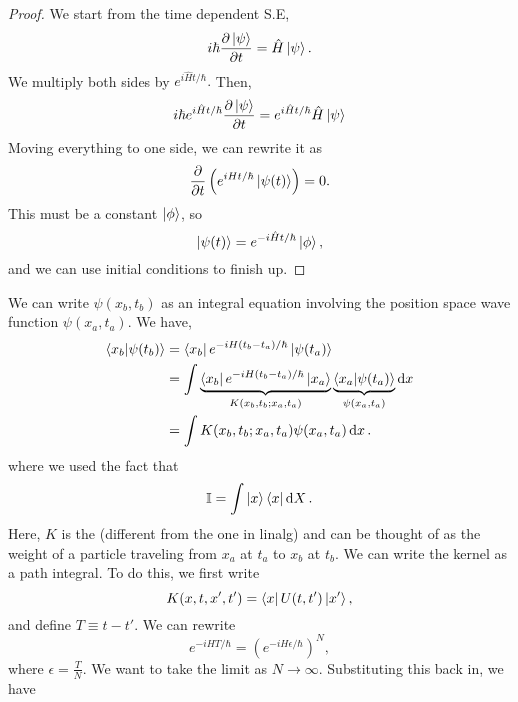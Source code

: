\documentclass{article}
\numberwithin{equation}{section}
\begin{document}
\begin{proof}
    We start from the time dependent S.E,
    \begin{equation}
        i\hbar \frac{\partial \ket{\psi}}{\partial t} = \hat{H}\ket{\psi}.
    \end{equation}
    We multiply both sides by $e^{i\hat{H}t/\hbar}.$ Then,
    \begin{align}
        i\hbar e^{i\hat{H}t/\hbar}\frac{\partial \ket{\psi}}{\partial t} = e^{i\hat{H}t/\hbar} \hat{H}\ket{\psi}
    \end{align}
    Moving everything to one side, we can rewrite it as 
    \begin{equation}
        \frac{\partial}{\partial t}\left(e^{iHt/\hbar}\ket{\psi(t)}\right) = 0.
    \end{equation}
    This must be a constant $\ket{\phi}$, so 
    \begin{equation}
        \ket{\psi(t)} = e^{-i\hat{H}t/\hbar}\ket{\phi},
    \end{equation}
    and we can use initial conditions to finish up.
\end{proof}
We can write $\psi(x_b,t_b)$ as an integral equation involving the position space wave function $\psi(x_a,t_a)$. We have,
    \begin{align}
        \bra{x_b}\ket{\psi(t_b)} &= \bra{x_b}e^{-iH(t_b-t_a)/\hbar}\ket{\psi(t_a)} \\ 
        &=\int \underbrace{\bra{x_b}e^{-iH(t_b-t_a)/\hbar}\ket{x_a}}_{K(x_b,t_b;x_a,t_a)}\underbrace{\bra{x_a}\ket{\psi(t_a)}}_{\psi(x_a,t_a)}\dd{x} \\ 
        &= \int K(x_b,t_b;x_a,t_a)\psi(x_a,t_a)\dd{x}.
    \end{align}
    where we used the fact that 
    \begin{equation}
        \mathbb{I} = \int \ket{x}\bra{x} \dd{X}.
    \end{equation}
    Here, $K$ is the  (different from the one in linalg) and can be thought of as the weight of a particle traveling from $x_a$ at $t_a$ to $x_b$ at $t_b.$ We can write the kernel as a path integral. To do this, we first write 
    \begin{equation}
        K(x,t,x',t') = \bra{x}U(t,t')\ket{x'},
    \end{equation}
    and define $T\equiv t-t'.$ We can rewrite 
    \begin{equation}
        e^{-iHT/\hbar} = (e^{-iH\epsilon/\hbar})^N,
    \end{equation}
    where $\epsilon = \frac{T}{N}.$ We want to take the limit as $N\to \infty.$ Substituting this back in, we have 
\end{document}
